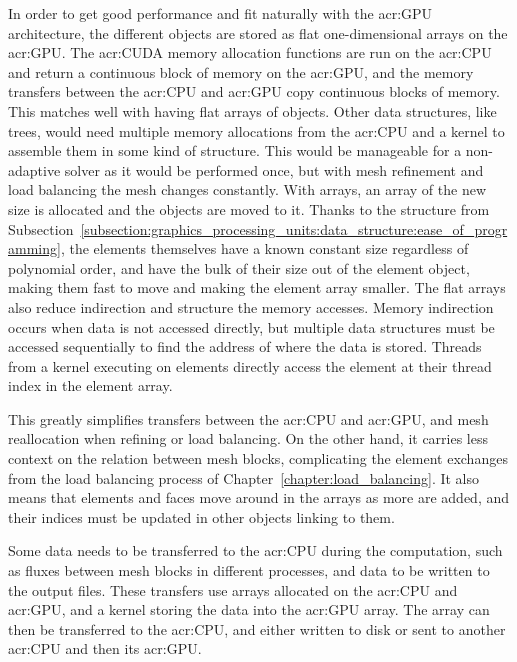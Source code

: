 In order to get good performance and fit naturally with the \acrshort{acr:GPU} architecture, the
different objects are stored as flat one-dimensional arrays on the \acrshort{acr:GPU}. The
\acrshort{acr:CUDA} memory allocation functions are run on the \acrshort{acr:CPU} and return a
continuous block of memory on the \acrshort{acr:GPU}, and the memory transfers between the
\acrshort{acr:CPU} and \acrshort{acr:GPU} copy continuous blocks of memory. This matches well with
having flat arrays of objects. Other data structures, like trees, would need multiple memory
allocations from the \acrshort{acr:CPU} and a kernel to assemble them in some kind of structure.
This would be manageable for a non-adaptive solver as it would be performed once, but with mesh
refinement and load balancing the mesh changes constantly. With arrays, an array of the new size is
allocated and the objects are moved to it. Thanks to the structure from
Subsection~\ref{subsection:graphics_processing_units:data_structure:ease_of_programming}, the
elements themselves have a known constant size regardless of polynomial order, and have the bulk of
their size out of the element object, making them fast to move and making the element array smaller.
The flat arrays also reduce indirection and structure the memory accesses. Memory indirection occurs
when data is not accessed directly, but multiple data structures must be accessed sequentially to
find the address of where the data is stored. Threads from a kernel executing on elements directly
access the element at their thread index in the element array.

This greatly simplifies transfers between the \acrshort{acr:CPU} and \acrshort{acr:GPU}, and mesh
reallocation when refining or load balancing. On the other hand, it carries less context on the
relation between mesh blocks, complicating the element exchanges from the load balancing process of
Chapter~\ref{chapter:load_balancing}. It also means that elements and faces move around in the
arrays as more are added, and their indices must be updated in other objects linking to them. 

Some data needs to be transferred to the \acrshort{acr:CPU} during the computation, such as fluxes
between mesh blocks in different processes, and data to be written to the output files. These
transfers use arrays allocated on the \acrshort{acr:CPU} and \acrshort{acr:GPU}, and a kernel
storing the data into the \acrshort{acr:GPU} array. The array can then be transferred to the
\acrshort{acr:CPU}, and either written to disk or sent to another \acrshort{acr:CPU} and then its
\acrshort{acr:GPU}.

